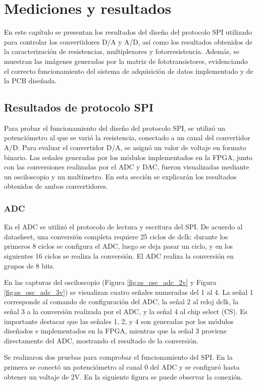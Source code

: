 \chapter{Mediciones y resultados}
En este capítulo se presentan los resultados del diseño del protocolo SPI utilizado para controlar los convertidores D/A y A/D, así como los resultados obtenidos de la caracterización de resistencias, multiplexores y fotorresistencia. Además, se muestran las imágenes generadas por la matriz de fototransistores, evidenciando el correcto funcionamiento del sistema de adquisición de datos implementado y de la PCB diseñada.


\section{Resultados de protocolo SPI}
Para probar el funcionamiento del diseño del protocolo SPI, se utilizó un potenciómetro al que se varió la resistencia, conectado a un canal del convertidor A/D. Para evaluar el convertidor D/A, se asignó un valor de voltaje en formato binario. Las señales generadas por los módulos implementados en la FPGA, junto con las conversiones realizadas por el ADC y DAC, fueron visualizadas mediante un osciloscopio y un multímetro. En esta sección se explicarán los resultados obtenidos de ambos convertidores.

\subsection{ADC}
En el ADC se utilizó el protocolo de lectura y escritura del SPI. De acuerdo al datasheet, una conversión completa requiere 25 ciclos de dclk: durante los primeros 8 ciclos se configura el ADC, luego se deja pasar un ciclo, y en los siguientes 16 ciclos se realiza la conversión. El ADC realiza la conversión en grupos de 8 bits.


En las capturas del osciloscopio (Figura \ref{fig:ss_osc_adc_2v} y Figura \ref{fig:ss_osc_adc_3v}) se visualizan cuatro señales numeradas del 1 al 4. La señal 1 corresponde al comando de configuración del ADC, la señal 2 al reloj dclk, la señal 3 a la conversión realizada por el ADC, y la señal 4 al chip select (CS). Es importante destacar que las señales 1, 2, y 4 son generadas por los módulos diseñados e implementados en la FPGA, mientras que la señal 3 proviene directamente del ADC, mostrando el resultado de la conversión.


Se realizaron dos pruebas para comprobar el funcionamiento del SPI. En la primera se conectó un potenciómetro al canal 0 del ADC y se configuró hasta obtener un voltaje de 2V. En la siguiente figura se puede observar la conexión.

